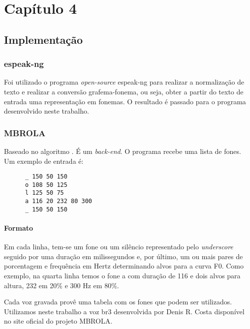 
\chapter{Capítulo 4}

\section{Implementação}

\subsection{espeak-ng}
Foi utilizado o programa \emph{open-source} espeak-ng \cite{espeakng} para realizar a normalização de texto e realizar a conversão grafema-fonema, ou seja, obter a partir do texto de entrada uma representação em fonemas. O resultado é passado para o programa desenvolvido neste trabalho.

\subsection{MBROLA}
Baseado no algoritmo  \cite{mbrpsola}. É um \emph{back-end}. O programa recebe uma lista de fones. Um exemplo de entrada é:

\begin{lstlisting}
      _ 150 50 150
      o 108 50 125
      l 125 50 75
      a 116 20 232 80 300
      _ 150 50 150
\end{lstlisting}


\subsubsection{Formato}
Em cada linha, tem-se um fone ou um silêncio representado pelo \emph{underscore} seguido por uma duração em milissegundos e, por último, um ou mais pares de porcentagem e frequência em Hertz determinando alvos para a curva F0. Como exemplo, na quarta linha temos o fone \/a\/ com duração de 116  e dois alvos para altura, 232  em 20\% e 300 Hz em 80\%.

Cada voz gravada provê uma tabela com os fones que podem ser utilizados. Utilizamos neste trabalho a voz br3 desenvolvida por Denis R. Costa disponível no site oficial do projeto MBROLA.

